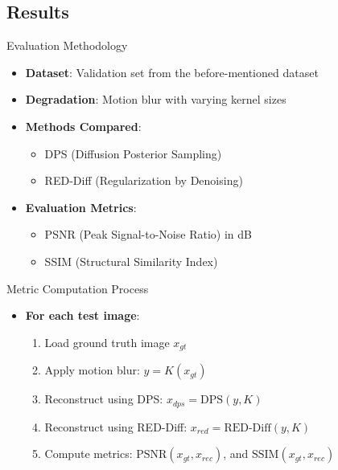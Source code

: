 \subsection{Results}

\begin{frame}{Evaluation Methodology}
    \begin{itemize}
        \item \textbf{Dataset}: Validation set from the before-mentioned dataset
        \item \textbf{Degradation}: Motion blur with varying kernel sizes
        \item \textbf{Methods Compared}:
        \begin{itemize}
            \item DPS (Diffusion Posterior Sampling)
            \item RED-Diff (Regularization by Denoising)
        \end{itemize}
        \item \textbf{Evaluation Metrics}:
        \begin{itemize}
            \item PSNR (Peak Signal-to-Noise Ratio) in dB
            \item SSIM (Structural Similarity Index)
        \end{itemize}
    \end{itemize}
\end{frame}

\begin{frame}{Metric Computation Process}
    \begin{itemize}
        \item \textbf{For each test image}:
              \begin{enumerate}
                  \item Load ground truth image $x_{gt}$
                  \item Apply motion blur: $y = K(x_{gt})$
                  \item Reconstruct using DPS: $x_{dps} = \text{DPS}(y, K)$
                  \item Reconstruct using RED-Diff: $x_{red} = \text{RED-Diff}(y, K)$
                  \item Compute metrics: $\text{PSNR}(x_{gt}, x_{rec})$, and $\text{SSIM}(x_{gt}, x_{rec})$
              \end{enumerate}
    \end{itemize}
\end{frame}

